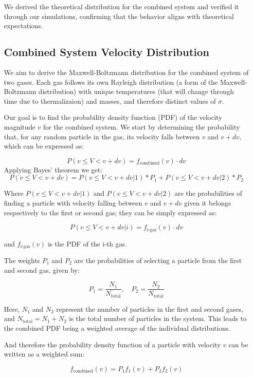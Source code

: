 \documentclass{article}
\begin{document}
We derived the theoretical distribution for the combined system and verified it through our simulations, confirming that the behavior aligns with theoretical expectations.

\subsection{Combined System Velocity Distribution}
We aim to derive the Maxwell-Boltzmann distribution for the combined system of two gases. Each gas follows its own Rayleigh distribution (a form of the Maxwell-Boltzmann distribution) with unique temperatures (that will change through time due to thermalizaion) and masses, and therefore distinct values of \( \sigma \).

Our goal is to find the probability density function (PDF) of the velocity magnitude \( v \) for the combined system. We start by determining the probability that, for any random particle in the gas, its velocity falls between \( v \) and \( v + dv \), which can be expressed as:

\[
P(v \leq V < v + dv) = f_{\text{combined}}(v) \cdot dv
\]
Applying Bayes' theorem we get: 
\[
    P(v \leq V < v + dv) = P(v \leq V < v + dv | 1)*P_1 + P(v \leq V < v + dv | 2)*P_2
\]

Where \(P(v \leq V < v + dv | 1)\) and \(P(v \leq V < v + dv | 2)\) are the probabilities of finding a particle with velocity falling between \( v \) and \( v + dv \) given it belongs respectively to the first or second gas; they can be simply expressed as:

\[
P(v \leq V < v + dv|i) = f_{\text{i-gas}}(v) \cdot dv 
\]

and \(f_{\text{i-gas}}(v)\) is the PDF of the i-th gas.

The weights \( P_1 \) and \( P_2 \) are the probabilities of selecting a particle from the first and second gas, given by:

\[
P_1 = \frac{N_1}{N_{\text{total}}}, \quad P_2 = \frac{N_2}{N_{\text{total}}}
\]

Here, \( N_1 \) and \( N_2 \) represent the number of particles in the first and second gases, and \( N_{\text{total}} = N_1 + N_2 \) is the total number of particles in the system. This leads to the combined PDF being a weighted average of the individual distributions.

And therefore the probability density function of a particle with velocity \( v \) can be written as a weighted sum:

\[
f_{\text{combined}}(v) = P_1 f_1(v) + P_2 f_2(v)
\]
\end{document}

